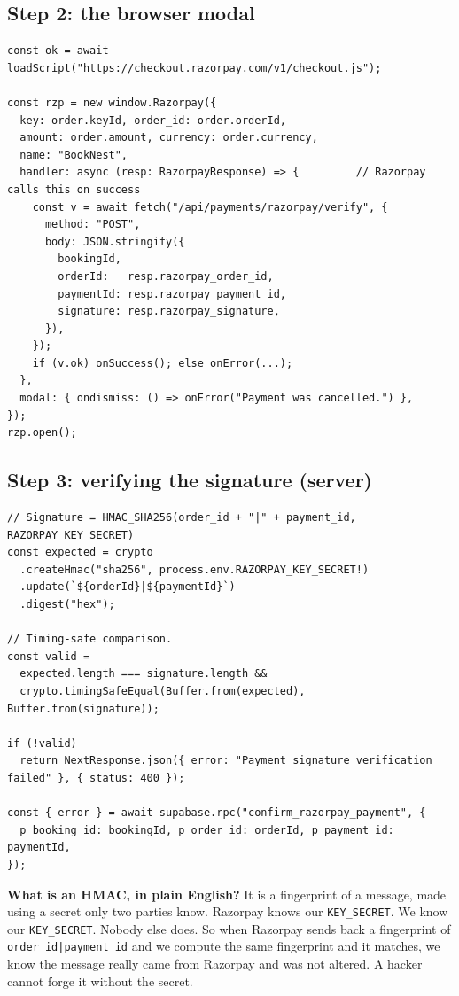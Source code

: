 \documentclass[11pt,a4paper]{article}
\begin{document}
\subsection{Step 2: the browser modal}

\begin{lstlisting}[language=TS,caption={lib/razorpayCheckout.ts}]
const ok = await loadScript("https://checkout.razorpay.com/v1/checkout.js");

const rzp = new window.Razorpay({
  key: order.keyId, order_id: order.orderId,
  amount: order.amount, currency: order.currency,
  name: "BookNest",
  handler: async (resp: RazorpayResponse) => {         // Razorpay calls this on success
    const v = await fetch("/api/payments/razorpay/verify", {
      method: "POST",
      body: JSON.stringify({
        bookingId,
        orderId:   resp.razorpay_order_id,
        paymentId: resp.razorpay_payment_id,
        signature: resp.razorpay_signature,
      }),
    });
    if (v.ok) onSuccess(); else onError(...);
  },
  modal: { ondismiss: () => onError("Payment was cancelled.") },
});
rzp.open();
\end{lstlisting}

\subsection{Step 3: verifying the signature (server)}

\begin{lstlisting}[language=TS,caption={app/api/payments/razorpay/verify/route.ts}]
// Signature = HMAC_SHA256(order_id + "|" + payment_id, RAZORPAY_KEY_SECRET)
const expected = crypto
  .createHmac("sha256", process.env.RAZORPAY_KEY_SECRET!)
  .update(`${orderId}|${paymentId}`)
  .digest("hex");

// Timing-safe comparison.
const valid =
  expected.length === signature.length &&
  crypto.timingSafeEqual(Buffer.from(expected), Buffer.from(signature));

if (!valid)
  return NextResponse.json({ error: "Payment signature verification failed" }, { status: 400 });

const { error } = await supabase.rpc("confirm_razorpay_payment", {
  p_booking_id: bookingId, p_order_id: orderId, p_payment_id: paymentId,
});
\end{lstlisting}

\begin{notebox}
\textbf{What is an HMAC, in plain English?} It is a fingerprint of a message,
made using a secret only two parties know. Razorpay knows our
\texttt{KEY\_SECRET}. We know our \texttt{KEY\_SECRET}. Nobody else does. So when
Razorpay sends back a fingerprint of \texttt{order\_id|payment\_id} and we compute
the same fingerprint and it matches, we know the message really came from Razorpay
and was not altered. A hacker cannot forge it without the secret.
\end{notebox}
\end{document}
